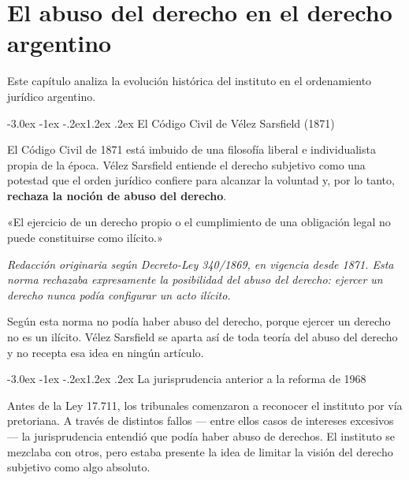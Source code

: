 \documentclass[12pt,oneside]{book}
\makeatletter
\renewcommand\section{\@startsection{section}{1}{\z@}%
  {-3.0ex \@plus -1ex \@minus -.2ex}{1.2ex \@plus .2ex}%
  {\normalfont\large\bfseries\color{acento}}}
\makeatother
\begin{document}

\chapter{El abuso del derecho en el derecho argentino}

Este capítulo analiza la evolución histórica del instituto en el ordenamiento jurídico argentino.

\section{El Código Civil de Vélez Sarsfield (1871)}

El Código Civil de 1871 está imbuido de una filosofía liberal e individualista propia de la época. Vélez Sarsfield entiende el derecho subjetivo como una potestad que el orden jurídico confiere para alcanzar la voluntad y, por lo tanto, \textbf{rechaza la noción de abuso del derecho}.

\begin{regla}
«El ejercicio de un derecho propio o el cumplimiento de una obligación legal no puede constituirse como ilícito.»

\smallskip
\textit{Redacción originaria según Decreto-Ley 340/1869, en vigencia desde 1871. Esta norma rechazaba expresamente la posibilidad del abuso del derecho: ejercer un derecho nunca podía configurar un acto ilícito.}
\end{regla}

Según esta norma no podía haber abuso del derecho, porque ejercer un derecho no es un ilícito. Vélez Sarsfield se aparta así de toda teoría del abuso del derecho y no recepta esa idea en ningún artículo.

\section{La jurisprudencia anterior a la reforma de 1968}

Antes de la Ley 17.711, los tribunales comenzaron a reconocer el instituto por vía pretoriana. A través de distintos fallos --- entre ellos casos de intereses excesivos --- la jurisprudencia entendió que podía haber abuso de derechos. El instituto se mezclaba con otros, pero estaba presente la idea de limitar la visión del derecho subjetivo como algo absoluto.
\end{document}
